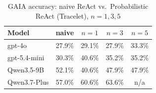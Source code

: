 \documentclass{article}
\begin{document}
\begin{table}[h]
\centering
\caption{GAIA accuracy: naive ReAct vs.\ Probabilistic ReAct (Tracelet), $n=1,3,5$}
\label{tab:naive-vs-tracelet}
\begin{tabular}{lcccc}
\toprule
Model & naive & $n=1$ & $n=3$ & $n=5$ \\
\midrule
gpt-4o        & 27.9\% & 29.1\% & 27.9\% & 33.3\% \\
gpt-5.4-mini  & 30.3\% & 40.6\% & 35.2\% & 35.2\% \\
Qwen3.5-9B    & 52.1\% & 40.6\% & 47.9\% & 47.9\% \\
Qwen3.7-Plus  & 57.0\% & 60.6\% & 63.6\% & n/a    \\
\bottomrule
\end{tabular}
\end{table}
\end{document}
